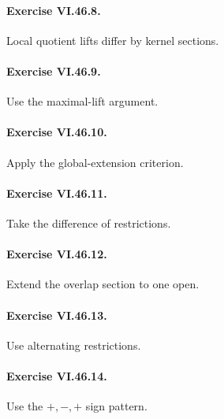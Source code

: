 \paragraph{Exercise VI.46.8.}
\begin{hint}
Local quotient lifts differ by kernel sections.
\end{hint}

\paragraph{Exercise VI.46.9.}
\begin{hint}
Use the maximal-lift argument.
\end{hint}

\paragraph{Exercise VI.46.10.}
\begin{hint}
Apply the global-extension criterion.
\end{hint}

\paragraph{Exercise VI.46.11.}
\begin{hint}
Take the difference of restrictions.
\end{hint}

\paragraph{Exercise VI.46.12.}
\begin{hint}
Extend the overlap section to one open.
\end{hint}

\paragraph{Exercise VI.46.13.}
\begin{hint}
Use alternating restrictions.
\end{hint}

\paragraph{Exercise VI.46.14.}
\begin{hint}
Use the \(+,-,+\) sign pattern.
\end{hint}

